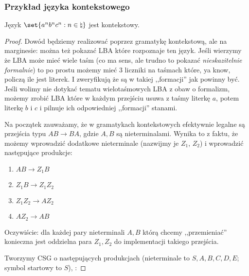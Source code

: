 \subsubsection{Przykład języka kontekstowego}
\label{csl_example}
\begin{theorem}
    Język \( \set{a^nb^nc^n : n \in \natural} \) jest kontekstowy.
\end{theorem}
\begin{proof}
    Dowód będziemy realizować poprzez gramatykę kontekstową, ale na marginesie: można też pokazać LBA które rozpoznaje ten język. Jeśli wierzymy że LBA może mieć wiele taśm (co ma sens, ale trudno to pokazać \textit{nieskazitelnie formalnie}) to po prostu możemy mieć 3 liczniki na taśmach które, ya know, policzą ile jest literek. I zweryfikują że są w takiej ,,formacji'' jak powinny być. Jeśli wolimy nie dotykać tematu wielotaśmowych LBA z obaw o formalizm, możemy zrobić LBA które w każdym przejściu usuwa z taśmy literkę \(a\), potem literkę \(b\) i \(c\) i pilnuje ich odpowiedniej ,,formacji'' stanami. 


    Na początek zauważamy, że w gramatykach kontekstowych efektywnie legalne są przejścia typu \(AB \rightarrow BA\), gdzie \(A, B\) są nieterminalami. Wynika to z faktu, że możemy wprowadzić dodatkowe nieterminale (nazwijmy je \(Z_1\), \(Z_2\)) i wprowadzić następujące produkcje:
    
    \begin{enumerate}
        \item \(AB \rightarrow Z_1B\)
        \item \(Z_1B \rightarrow Z_1Z_2 \) 
        \item \( Z_1Z_2 \rightarrow AZ_2 \)
        \item \( AZ_2 \rightarrow AB \)        
    \end{enumerate}
    
    Oczywiście: dla każdej pary nieterminali \(A, B\) którą chcemy ,,przemieniać'' konieczna jest oddzielna para \(Z_1, Z_2\) do implementacji takiego przejścia. 

    Tworzymy CSG o następujących produkcjach (nieterminale to \(S, A, B, C, D, E\); symbol startowy to \(S\)), :
    

\end{proof}
